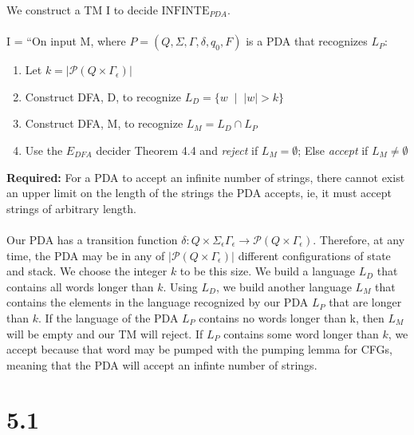 \documentclass{article}
\begin{document}
We construct a TM I to decide $\textrm{INFINTE}_{PDA}$. \\\\
I = ``On input M, where $P=(Q,\Sigma,\Gamma,\delta,q_0,F)$ is a PDA that recognizes $L_P$:
\begin{enumerate}
    \item Let $k = |\mathscr{P}(Q \times \Gamma_\epsilon)|$
    \item Construct DFA, D, to recognize $L_D = \{ w \;\; \bigr | \;\; |w| > k \}$
    \item Construct DFA, M, to recognize $L_M = L_D \cap L_P$
    \item Use the $E_{DFA}$ decider Theorem 4.4 and \textit{reject} if $L_M = \emptyset$; Else \textit{accept} if $L_M \neq \emptyset$
\end{enumerate}
\textbf{Required:} For a PDA to accept an infinite number of strings, there cannot exist an upper limit on the length of the strings the PDA accepts, ie, it must accept strings of arbitrary length. \\\\
Our PDA has a transition function $\delta: Q \times \Sigma_\epsilon \Gamma_\epsilon \rightarrow \mathscr{P}(Q \times \Gamma_\epsilon)$. Therefore, at any time, the PDA may be in any of $|\mathscr{P}(Q \times \Gamma_\epsilon)|$ different configurations of state and stack. We choose the integer $k$ to be this size. We build a language $L_D$ that contains all words longer than $k$. Using $L_D$, we build another language $L_M$ that contains the elements in the language recognized by our PDA $L_P$ that are longer than $k$. If the language of the PDA $L_P$ contains no words longer than k, then $L_M$ will be empty and our TM will reject. If $L_P$ contains some word longer than $k$, we accept because that word may be pumped with the pumping lemma for CFGs, meaning that the PDA will accept an infinte number of strings. 

\section*{5.1}
\end{document}
